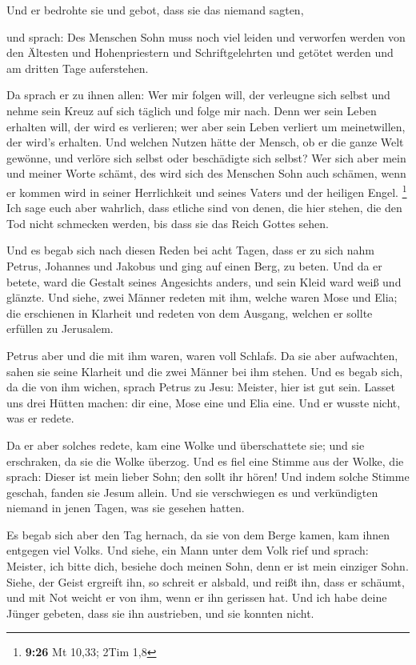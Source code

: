  Und er bedrohte sie und gebot, dass sie das niemand
sagten,

 und sprach: Des Menschen Sohn muss noch viel leiden und
verworfen werden von den Ältesten und Hohenpriestern und
Schriftgelehrten und getötet werden und am dritten Tage auferstehen.

 Da sprach er zu ihnen allen: Wer mir folgen will, der
verleugne sich selbst und nehme sein Kreuz auf sich täglich und folge
mir nach.  Denn wer sein Leben erhalten will, der wird es
verlieren; wer aber sein Leben verliert um meinetwillen, der wird's
erhalten.  Und welchen Nutzen hätte der Mensch, ob er die
ganze Welt gewönne, und verlöre sich selbst oder beschädigte sich
selbst?  Wer sich aber mein und meiner Worte schämt, des
wird sich des Menschen Sohn auch schämen, wenn er kommen wird in seiner
Herrlichkeit und seines Vaters und der heiligen Engel. \footnote{\textbf{9:26}
  Mt 10,33; 2Tim 1,8}  Ich sage euch aber wahrlich, dass
etliche sind von denen, die hier stehen, die den Tod nicht schmecken
werden, bis dass sie das Reich Gottes sehen.

 Und es begab sich nach diesen Reden bei acht Tagen, dass
er zu sich nahm Petrus, Johannes und Jakobus und ging auf einen Berg, zu
beten.  Und da er betete, ward die Gestalt seines
Angesichts anders, und sein Kleid ward weiß und glänzte. 
Und siehe, zwei Männer redeten mit ihm, welche waren Mose und Elia;
 die erschienen in Klarheit und redeten von dem Ausgang,
welchen er sollte erfüllen zu Jerusalem.

 Petrus aber und die mit ihm waren, waren voll Schlafs. Da
sie aber aufwachten, sahen sie seine Klarheit und die zwei Männer bei
ihm stehen.  Und es begab sich, da die von ihm wichen,
sprach Petrus zu Jesu: Meister, hier ist gut sein. Lasset uns drei
Hütten machen: dir eine, Mose eine und Elia eine. Und er wusste nicht,
was er redete.

 Da er aber solches redete, kam eine Wolke und
überschattete sie; und sie erschraken, da sie die Wolke überzog.
 Und es fiel eine Stimme aus der Wolke, die sprach: Dieser
ist mein lieber Sohn; den sollt ihr hören!  Und indem
solche Stimme geschah, fanden sie Jesum allein. Und sie verschwiegen es
und verkündigten niemand in jenen Tagen, was sie gesehen hatten.

 Es begab sich aber den Tag hernach, da sie von dem Berge
kamen, kam ihnen entgegen viel Volks.  Und siehe, ein Mann
unter dem Volk rief und sprach: Meister, ich bitte dich, besiehe doch
meinen Sohn, denn er ist mein einziger Sohn.  Siehe, der
Geist ergreift ihn, so schreit er alsbald, und reißt ihn, dass er
schäumt, und mit Not weicht er von ihm, wenn er ihn gerissen hat.
 Und ich habe deine Jünger gebeten, dass sie ihn
austrieben, und sie konnten nicht.

